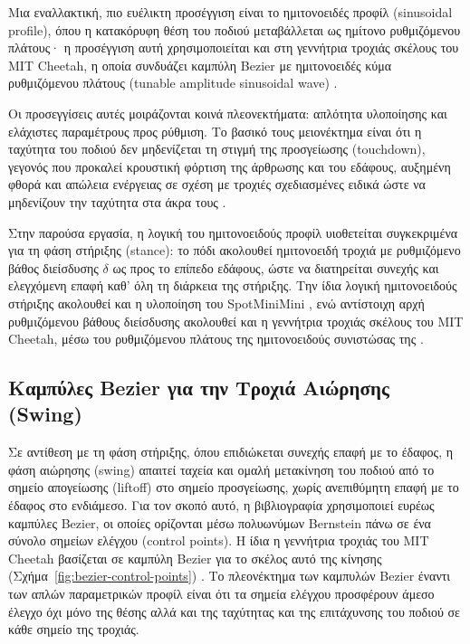 \documentclass[11pt]{report}
\begin{document}
Μια εναλλακτική, πιο ευέλικτη προσέγγιση είναι το ημιτονοειδές
προφίλ (sinusoidal profile), όπου η κατακόρυφη θέση του ποδιού
μεταβάλλεται ως ημίτονο ρυθμιζόμενου πλάτους· η προσέγγιση αυτή χρησιμοποιείται
και στη γεννήτρια τροχιάς σκέλους του MIT Cheetah, η οποία συνδυάζει καμπύλη
Bezier με ημιτονοειδές κύμα ρυθμιζόμενου πλάτους (tunable amplitude sinusoidal
wave) \cite{hyun_high_2014}.

Οι προσεγγίσεις αυτές μοιράζονται κοινά πλεονεκτήματα: απλότητα υλοποίησης
και ελάχιστες παραμέτρους προς ρύθμιση. Το βασικό τους μειονέκτημα είναι ότι η
ταχύτητα του ποδιού δεν μηδενίζεται τη στιγμή της προσγείωσης (touchdown),
γεγονός που προκαλεί κρουστική φόρτιση της άρθρωσης και του εδάφους, αυξημένη
φθορά και απώλεια ενέργειας σε σχέση με τροχιές σχεδιασμένες ειδικά ώστε να
μηδενίζουν την ταχύτητα στα άκρα τους \cite{zeng_leg_2019}.

Στην παρούσα εργασία, η λογική του ημιτονοειδούς προφίλ υιοθετείται
συγκεκριμένα για τη φάση στήριξης (stance): το πόδι ακολουθεί ημιτονοειδή
τροχιά με ρυθμιζόμενο βάθος διείσδυσης $\delta$ ως προς το επίπεδο εδάφους,
ώστε να διατηρείται συνεχής και ελεγχόμενη επαφή καθ' όλη τη διάρκεια της
στήριξης. Την ίδια λογική ημιτονοειδούς στήριξης ακολουθεί και η υλοποίηση
του SpotMiniMini \cite{spotminimini2020github}, ενώ αντίστοιχη αρχή
ρυθμιζόμενου βάθους διείσδυσης ακολουθεί και η γεννήτρια τροχιάς σκέλους του
MIT Cheetah, μέσω του ρυθμιζόμενου πλάτους της ημιτονοειδούς συνιστώσας της
\cite{hyun_high_2014}.

\subsection{Καμπύλες Bezier για την Τροχιά Αιώρησης (Swing)}
\label{subsec:bezier-litreview}
Σε αντίθεση με τη φάση στήριξης, όπου επιδιώκεται συνεχής επαφή με το έδαφος,
η φάση αιώρησης (swing) απαιτεί ταχεία και ομαλή μετακίνηση του ποδιού από το
σημείο απογείωσης (liftoff) στο σημείο προσγείωσης, χωρίς ανεπιθύμητη επαφή με
το έδαφος στο ενδιάμεσο. Για τον σκοπό αυτό, η βιβλιογραφία χρησιμοποιεί
ευρέως καμπύλες Bezier, οι οποίες ορίζονται μέσω πολυωνύμων Bernstein πάνω σε
ένα σύνολο σημείων ελέγχου (control points). Η ίδια η γεννήτρια τροχιάς του
MIT Cheetah βασίζεται σε καμπύλη Bezier για το σκέλος αυτό της κίνησης
(Σχήμα~\ref{fig:bezier-control-points}) \cite{hyun_high_2014}. Το πλεονέκτημα των καμπυλών Bezier έναντι των απλών
παραμετρικών προφίλ είναι ότι τα σημεία ελέγχου προσφέρουν άμεσο έλεγχο όχι
μόνο της θέσης αλλά και της ταχύτητας και της επιτάχυνσης του ποδιού σε κάθε
σημείο της τροχιάς.
\end{document}
